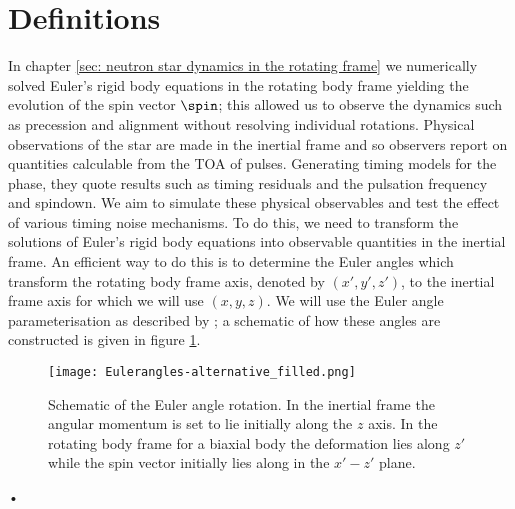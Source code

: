 \documentclass[/home/greg/Thesis/main/main.tex]{subfiles}
\begin{document}
\graphicspath{{/home/greg/Neutron_star_modelling/TimingNoiseModels/InertialSpaceResults/img/}}

\newcommand{\Jr}{J_{\textrm{rot}}}
\newcommand{\Ji}{J_{\textrm{in}}}

\section{Definitions}
In chapter \ref{sec: neutron star dynamics in the rotating frame} we
numerically solved Euler's rigid body equations in the rotating body frame
yielding the evolution of the spin vector $\spin$; this allowed us to observe
the dynamics such as precession and alignment without resolving individual
rotations. Physical observations of the star are made in the inertial frame and
so observers report on quantities calculable from the TOA of pulses. Generating
timing models for the phase, they quote results such as timing residuals and
the pulsation frequency and spindown. We aim to simulate these physical
observables and test the effect of various timing noise mechanisms. To do
this, we need to transform the solutions of Euler's rigid body equations into
observable quantities in the inertial frame. An efficient way to do this is to
determine the Euler angles which transform the rotating body frame axis,
denoted by $(x',y', z')$, to the inertial frame axis for which we will use $(x,
y, z)$. We will use the Euler angle parameterisation as described by
\citet{Landau1969}; a schematic of how these angles are constructed is given in
figure \ref{fig: Euler}. 
\begin{figure}[ht]
\centering
\texttt{[image: Eulerangles-alternative\_filled.png]}
\caption{Schematic of the Euler angle rotation. In the inertial frame the
angular momentum is set to lie initially along the $z$ axis. In the rotating
body frame for a biaxial body the deformation lies along $z'$ while the spin
vector initially lies along in the $x'- z'$ plane.}
\label{fig: Euler}
\end{figure}•
\end{document}

